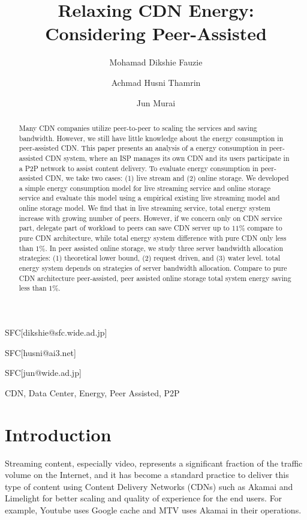\documentclass[JIP]{ipsj}
\begin{document}
\title{Relaxing CDN Energy: Considering Peer-Assisted}


\author{Mohamad Dikshie Fauzie}{SFC}[dikshie@sfc.wide.ad.jp]
\author{Achmad Husni Thamrin}{SFC}[husni@ai3.net]
\author{Jun Murai}{SFC}[jun@wide.ad.jp]


\begin{abstract}

Many CDN companies utilize peer-to-peer to scaling the services and saving bandwidth.
However, we still have little knowledge about the energy consumption in peer-assisted CDN.
This paper presents an analysis of a energy consumption in peer-assisted CDN system, where an ISP manages its own CDN and its users participate in a P2P network to assist content delivery.
To evaluate energy consumption in peer-assisted CDN, we take two cases: (1) live stream and (2) online storage.
We developed a simple energy consumption model for live streaming service and online storage service and evaluate this model using a empirical existing live streaming model and online storage model.
We find that in live streaming service, total energy system increase with growing number of peers.
However, if we concern only on CDN service part, delegate part of workload to peers can save CDN server up to $11\%$ compare to pure CDN architecture, while total energy system difference with pure CDN only less than $1\%$. 
In peer assisted online storage, we study three server bandwidth allocation strategies: (1) theoretical lower bound, (2) request driven, and (3) water level.  
total energy system depends on strategies of server bandwidth allocation.
Compare to pure CDN architecture peer-assisted, peer assisted online storage total system energy saving less than $1\%$.
\end{abstract}


\begin{keyword}
CDN, Data Center, Energy, Peer Assisted, P2P
\end{keyword}

\maketitle

\section{Introduction}\label{intro}
Streaming content, especially video, represents a significant fraction of the traffic volume on the Internet, and it has become a standard practice to deliver this type of content using Content Delivery Networks (CDNs) such as Akamai and Limelight for better scaling and quality of experience for the end users.  
For example, Youtube uses Google cache and MTV uses Akamai in their operations.
\end{document}
